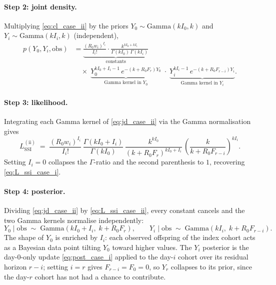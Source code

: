 \documentclass{article}
\theoremstyle{definition}
\begin{document}
\paragraph{Step 2: joint density.}
Multiplying \eqref{eq:cl_case_ii} by the priors
$Y_0 \sim \mathrm{Gamma}(k I_0, k)$ and $Y_i \sim \mathrm{Gamma}(k I_i, k)$
(independent),
\begin{equation}\label{eq:jd_case_ii}
  \begin{aligned}
    p(Y_0, Y_i, \mathrm{obs})
    &= \underbrace{\frac{(R_0 w_i)^{I_i}}{I_i!} \cdot
    \frac{k^{k I_0 + k I_i}}{\Gamma(k I_0)\, \Gamma(k I_i)}}_{\text{constants}}
    \\[2pt]
    &\quad\times\;
    \underbrace{Y_0^{k I_0 + I_i - 1}\, e^{-(k + R_0 F_r)
    Y_0}}_{\text{Gamma kernel in } Y_0}
    \;\cdot\;
    \underbrace{Y_i^{k I_i - 1}\, e^{-(k + R_0 F_{r-i})
    Y_i}}_{\text{Gamma kernel in } Y_i}.
  \end{aligned}
\end{equation}

\paragraph{Step 3: likelihood.}
Integrating each Gamma kernel of \eqref{eq:jd_case_ii} via the Gamma
normalisation gives
\begin{equation}\label{eq:L_ssi_case_ii}
  L_\mathrm{SSI}^{(\mathrm{ii})}
  \;=\; \frac{(R_0 w_i)^{I_i}}{I_i!}\,
  \frac{\Gamma(k I_0 + I_i)}{\Gamma(k I_0)}\,
  \frac{k^{k I_0}}{(k + R_0 F_r)^{k I_0 + I_i}}\,
  \left(\frac{k}{k + R_0 F_{r-i}}\right)^{k I_i}.
\end{equation}
Setting $I_i = 0$ collapses the $\Gamma$-ratio and the second
parenthesis to $1$, recovering \eqref{eq:L_ssi_case_i}.

\paragraph{Step 4: posterior.}
Dividing \eqref{eq:jd_case_ii} by \eqref{eq:L_ssi_case_ii}, every
constant cancels and the two Gamma kernels normalise independently:
\begin{equation}\label{eq:post_case_ii}
  Y_0 \mid \mathrm{obs} \;\sim\; \mathrm{Gamma}(k I_0 + I_i,\; k + R_0 F_r),
  \qquad
  Y_i \mid \mathrm{obs} \;\sim\; \mathrm{Gamma}(k I_i,\; k + R_0 F_{r-i}).
\end{equation}
The shape of $Y_0$ is enriched by $I_i$: each observed offspring of
the index cohort acts as a Bayesian data point tilting $Y_0$ toward
higher values.  The $Y_i$ posterior is the day-0-only update
\eqref{eq:post_case_i} applied to the day-$i$ cohort over its residual
horizon $r - i$; setting $i = r$ gives $F_{r-i} = F_0 = 0$, so $Y_r$
collapses to its prior, since the day-$r$ cohort has not had a
chance to contribute.
\end{document}
